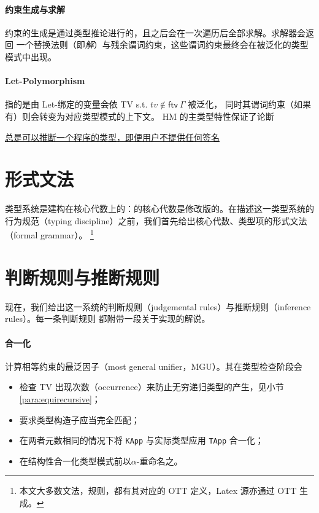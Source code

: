 \paragraph{约束生成与求解} 约束的生成是通过类型推论进行的，且之后会在一次遍历后全部求解。求解器会返回
一个替换法则（即\emph{解}）与残余谓词约束，这些谓词约束最终会在被泛化的类型模式中出现。
\paragraph{Let-Polymorphism} 指的是由 Let-绑定的变量会依 TV s.t. $tv\notin\mathsf{ftv}\ \Gamma$ 被泛化，
同时其谓词约束（如果有）则会转变为对应类型模式的上下文。
HM 的主类型特性保证了论断
\begin{center}
  \underline{总是可以推断一个程序的类型，即便用户不提供任何签名}
\end{center}

\section{形式文法}

类型系统是建构在核心代数上的：\Tigris 的核心代数是修改版的\lambdacalc。在描述这一类型系统的
行为规范（typing discipline）之前，我们首先给出核心代数、类型项的形式文法（formal grammar）。
\footnote{本文大多数文法，规则，都有其对应的 OTT 定义，Latex 源亦通过 OTT 生成。}

\section{判断规则与推断规则}

现在，我们给出这一系统的判断规则（judgemental rules）与推断规则（inference rules）。每一条判断规则
都附带一段关于实现的解说。

\paragraph{合一化} 计算相等约束的最泛因子（most general unifier，MGU）。其在类型检查阶段会
\vspace{-1em}
\begin{itemize}\itemsep-.8em
  \item 检查 TV 出现次数（occurrence）来防止无穷递归类型的产生，见小节 \ref{para:equirecursive}；
  \item 要求类型构造子应当完全匹配；
  \item 在两者元数相同的情况下将 \texttt{KApp} 与实际类型应用 \texttt{TApp} 合一化；
  \item 在结构性合一化类型模式前以$\alpha$-重命名之。
\end{itemize}
